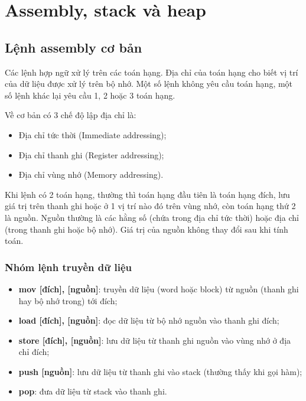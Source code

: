 \chapter*{Assembly, stack và heap}

\section{Lệnh assembly cơ bản}

Các lệnh hợp ngữ xử lý trên các toán hạng. Địa chỉ của toán hạng cho biết vị trí của dữ liệu được xử lý trên bộ nhớ. Một số lệnh không yêu cầu toán hạng, một số lệnh khác lại yêu cầu 1, 2 hoặc 3 toán hạng.

Về cơ bản có 3 chế độ lập địa chỉ là:
\begin{itemize}
    \item Địa chỉ tức thời (Immediate addressing);
    \item Địa chỉ thanh ghi (Register addressing);
    \item Địa chỉ vùng nhớ (Memory addressing).
\end{itemize}

Khi lệnh có 2 toán hạng, thường thì toán hạng đầu tiên là toán hạng đích, lưu giá trị trên thanh ghi hoặc ở 1 vị trí nào đó trên vùng nhớ, còn toán hạng thứ 2 là nguồn. Nguồn thường là các hằng số (chứa trong địa chỉ tức thời) hoặc địa chỉ (trong thanh ghi hoặc bộ nhớ). Giá trị của nguồn không thay đổi sau khi tính toán.

\subsection*{Nhóm lệnh truyền dữ liệu}

\begin{itemize}
    \item \textbf{mov [đích], [nguồn]}: truyền dữ liệu (word hoặc block) từ nguồn (thanh ghi hay bộ nhớ trong) tới đích;
    \item \textbf{load [đích], [nguồn]}: đọc dữ liệu từ bộ nhớ nguồn vào thanh ghi đích;
    \item \textbf{store [đích], [nguồn]}: lưu dữ liệu từ thanh ghi nguồn vào vùng nhớ ở địa chỉ đích;
    \item \textbf{push [nguồn]}: lưu dữ liệu từ thanh ghi vào stack (thường thấy khi gọi hàm);
    \item \textbf{pop}: đưa dữ liệu từ stack vào thanh ghi.
\end{itemize}

